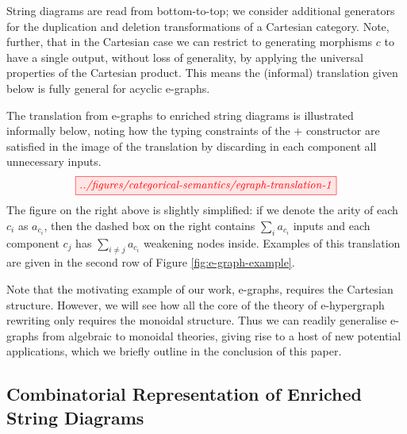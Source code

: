 String diagrams are read from bottom-to-top; we consider additional generators for the duplication and deletion transformations of a Cartesian category.  Note, further, that in the Cartesian case we can restrict to generating morphisms $c$ to have a single output,  without loss of generality,  by applying the universal properties of the Cartesian product.  This means the (informal) translation given below is fully general for acyclic e-graphs. 

The translation from e-graphs to enriched string diagrams is illustrated informally below,
noting how the typing constraints of the $+$ constructor are satisfied in the image of the translation by discarding in each component all unnecessary inputs.
\[
    \tikzfig{../figures/categorical-semantics/egraph-translation-1}
\]
The figure on the right above is slightly simplified: if we denote the arity of each $c_i$ as $a_{c_{i}}$, then the dashed box on the right contains $\sum\limits_{i} a_{c_{i}}$ inputs and each component $c_j$ has $\sum\limits_{i \not = j} a_{c_{i}}$ weakening nodes inside.
Examples of this translation are given in the second row of Figure \ref{fig:e-graph-example}.

Note that the motivating example of our work, e-graphs, requires the Cartesian structure. 
However, we will see how all the core of the theory of e-hypergraph rewriting only requires the monoidal structure. 
Thus we can readily generalise e-graphs from algebraic to monoidal theories, giving rise to a  host of new potential applications, which we briefly outline in the conclusion of this paper.   

\subsection{Combinatorial Representation of Enriched String Diagrams}

